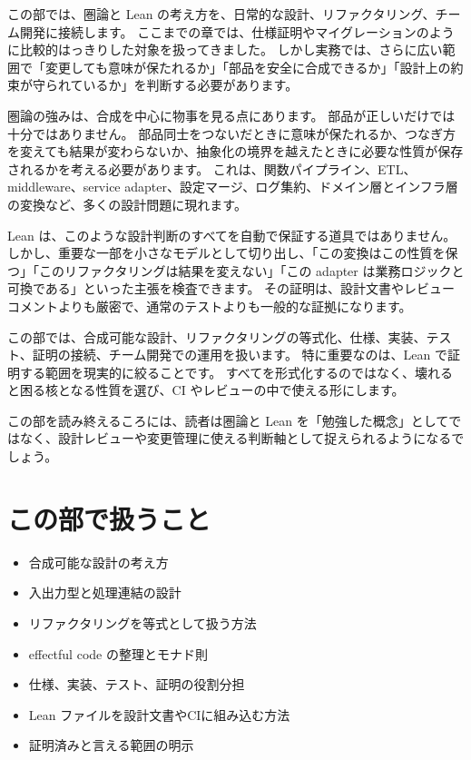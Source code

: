 
この部では、圏論と Lean の考え方を、日常的な設計、リファクタリング、チーム開発に接続します。
ここまでの章では、仕様証明やマイグレーションのように比較的はっきりした対象を扱ってきました。
しかし実務では、さらに広い範囲で「変更しても意味が保たれるか」「部品を安全に合成できるか」「設計上の約束が守られているか」を判断する必要があります。

圏論の強みは、合成を中心に物事を見る点にあります。
部品が正しいだけでは十分ではありません。
部品同士をつないだときに意味が保たれるか、つなぎ方を変えても結果が変わらないか、抽象化の境界を越えたときに必要な性質が保存されるかを考える必要があります。
これは、関数パイプライン、ETL、middleware、service adapter、設定マージ、ログ集約、ドメイン層とインフラ層の変換など、多くの設計問題に現れます。

Lean は、このような設計判断のすべてを自動で保証する道具ではありません。
しかし、重要な一部を小さなモデルとして切り出し、「この変換はこの性質を保つ」「このリファクタリングは結果を変えない」「この adapter は業務ロジックと可換である」といった主張を検査できます。
その証明は、設計文書やレビューコメントよりも厳密で、通常のテストよりも一般的な証拠になります。

この部では、合成可能な設計、リファクタリングの等式化、仕様、実装、テスト、証明の接続、チーム開発での運用を扱います。
特に重要なのは、Lean で証明する範囲を現実的に絞ることです。
すべてを形式化するのではなく、壊れると困る核となる性質を選び、CI やレビューの中で使える形にします。

この部を読み終えるころには、読者は圏論と Lean を「勉強した概念」としてではなく、設計レビューや変更管理に使える判断軸として捉えられるようになるでしょう。

\section*{この部で扱うこと}

\begin{itemize}
\item 合成可能な設計の考え方
\item 入出力型と処理連結の設計
\item リファクタリングを等式として扱う方法
\item effectful code の整理とモナド則
\item 仕様、実装、テスト、証明の役割分担
\item Lean ファイルを設計文書やCIに組み込む方法
\item 証明済みと言える範囲の明示
\end{itemize}
